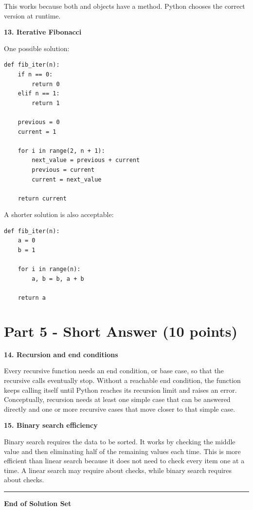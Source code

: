 \documentclass[11pt]{article}
\newcommand{\code}[1]{\texttt{\detokenize{#1}}}
\begin{document}
This works because both \code{Plant} and \code{Flower} objects have a \code{print_info()} method. Python chooses the correct version at runtime.

\newpage

\textbf{13. Iterative Fibonacci}

One possible solution:

\begin{verbatim}
def fib_iter(n):
    if n == 0:
        return 0
    elif n == 1:
        return 1

    previous = 0
    current = 1

    for i in range(2, n + 1):
        next_value = previous + current
        previous = current
        current = next_value

    return current
\end{verbatim}

A shorter solution is also acceptable:

\begin{verbatim}
def fib_iter(n):
    a = 0
    b = 1

    for i in range(n):
        a, b = b, a + b

    return a
\end{verbatim}

\section*{Part 5 - Short Answer (10 points)}

\textbf{14. Recursion and end conditions}

Every recursive function needs an end condition, or base case, so that the recursive calls eventually stop. Without a reachable end condition, the function keeps calling itself until Python reaches its recursion limit and raises an error. Conceptually, recursion needs at least one simple case that can be answered directly and one or more recursive cases that move closer to that simple case.

\textbf{15. Binary search efficiency}

Binary search requires the data to be sorted. It works by checking the middle value and then eliminating half of the remaining values each time. This is more efficient than linear search because it does not need to check every item one at a time. A linear search may require about \code{n} checks, while binary search requires about \code{log2(n)} checks.

\hrule
\begin{center}
\textbf{End of Solution Set}
\end{center}
\end{document}
